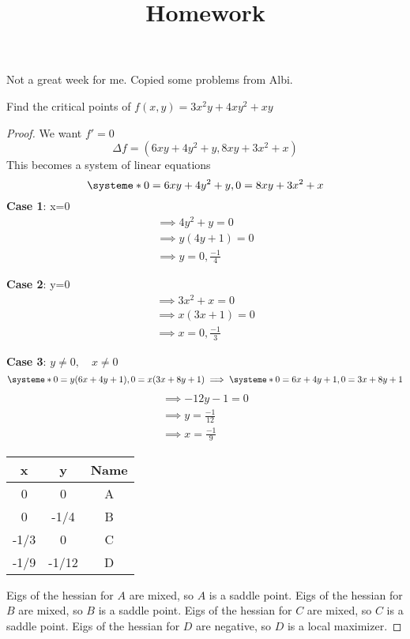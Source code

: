 \documentclass[12pt]{article}
\title{Homework}
\newenvironment{problem}[2][Problem]{\begin{trivlist}
\item[\hskip \labelsep {\bfseries #1}\hskip \labelsep {\bfseries #2.}]}{\end{trivlist}}
\begin{document}
Not a great week for me. Copied some problems from Albi.

\begin{problem}{6.6}
Find the critical points of $f(x,y) = 3x^2y + 4xy^2 + xy$
\begin{proof}
We want $f'=0$
$$ \Delta f = (6xy + 4y^2 + y, 8xy + 3x^2 + x)$$
This becomes a system of linear equations
\[
\systeme*{0=6xy + 4y^2 + y, 0=8xy + 3x^2 + x}
\]
\textbf{Case 1}: x=0
\begin{align*}
\implies 4y^2 + y = 0 \\
\implies y(4y + 1) = 0 \\
\implies y = 0, \frac{-1}{4}
\end{align*}

\textbf{Case 2}: y=0
\begin{align*}
\implies 3x^2 + x = 0 \\
\implies x(3x + 1) = 0 \\
\implies x = 0, \frac{-1}{3}
\end{align*}

\textbf{Case 3}:
$y \neq 0, \quad x \neq 0$
\[
\systeme*{0=y(6x + 4y + 1), 0=x(3x + 8y + 1)}
\implies \systeme*{0=6x + 4y + 1, 0=3x + 8y + 1}
\]
\begin{align*}
\implies -12y - 1 = 0 \\
\implies y = \frac{-1}{12} \\
\implies x = \frac{-1}{9}
\end{align*}

\begin{center}
 \begin{tabular}{||c c c||}
 \hline
 x & y & Name\\ [0.5ex]
 \hline\hline
 0 & 0 & A\\
 \hline
 0 & -1/4 & B\\
 \hline
 -1/3 & 0 & C\\
 \hline
 -1/9 & -1/12 & D\\
 \hline
 \hline
\end{tabular}
\end{center}

Eigs of the hessian for $A$ are  mixed, so $A$ is a saddle point.
Eigs of the hessian for $B$ are  mixed, so $B$ is a saddle point.
Eigs of the hessian for $C$ are  mixed, so $C$ is a saddle point.
Eigs of the hessian for $D$ are  negative, so $D$ is a local maximizer.

\end{proof}
\end{problem}
\end{document}
